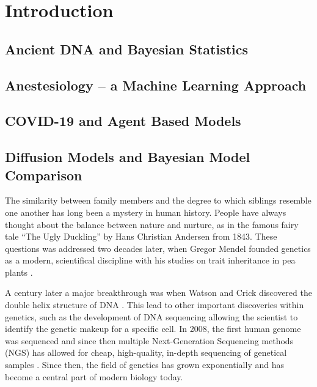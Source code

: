 
\chapter{Introduction}



\section{Ancient DNA and Bayesian Statistics}
\label{section:ancientDNA}



\section{Anestesiology -- a Machine Learning Approach }
\label{section:machine-learning}


\section{COVID-19 and Agent Based Models}
\label{section:agent-based-models}


\section{Diffusion Models and Bayesian Model Comparison}
\label{section:diffusion}

The similarity between family members and the degree to which siblings resemble one another has long been a mystery in human history.
People have always thought about the balance between nature and nurture, as in the famous fairy tale ``The Ugly Duckling'' by Hans Christian Andersen from 1843. These questions was addressed two decades later, when Gregor Mendel founded genetics as a modern, scientifical discipline with his studies on trait inheritance in pea plants \autocite{mendelgregorVersucheUberPflanzenhybriden1866}.

A century later a major breakthrough was when Watson and Crick discovered the double helix structure of DNA \autocite{watsonMolecularStructureNucleic1953}. This lead to other important discoveries within genetics, such as the development of DNA sequencing allowing the scientist to identify the genetic makeup for a specific cell. In 2008, the first human genome was sequenced and since then multiple Next-Generation Sequencing methods (NGS) has allowed for cheap, high-quality, in-depth sequencing of genetical samples \autocite{genomicsBriefHistoryNext2021}. Since then, the field of genetics has grown exponentially and has become a central part of modern biology today.

